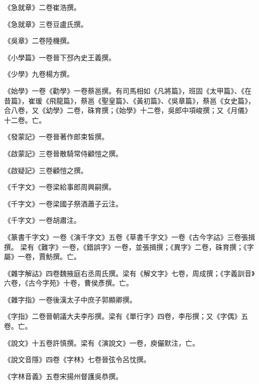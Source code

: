 \begin{pinyinscope}
 《急就章》二卷崔浩撰。



 《急就章》三卷豆盧氏撰。



 《吳章》二卷陸機撰。



 《小學篇》一卷晉下邳內史王義撰。



 《少學》九卷楊方撰。



 《始學》一卷《勸學》一卷蔡邕撰。有司馬相如《凡將篇》，班固《太甲篇》、《在昔篇》，崔瑗《飛龍篇》，蔡邕《聖皇篇》、《黃初篇》、《吳章篇》，蔡邕《女史篇》，合八卷，又《幼學》二卷，硃育撰；《始學》十二卷，吳郎中項峻撰；又《月儀》十二卷。亡。



 《發蒙記》一卷晉著作郎束皙撰。



 《啟蒙記》三卷晉散騎常侍顧愷之撰。



 《啟疑記》三卷顧愷之撰。



 《千字文》一卷梁給事郎周興嗣撰。



 《千字文》一卷梁國子祭酒蕭子云注。



 《千字文》一卷胡肅注。



 《篆書千字文》一卷《演千字文》五卷《草書千字文》一卷《古今字詁》三卷張揖撰。
 梁有《難字》一卷，《錯誤字》一卷，並張揖撰；《異字》二卷，硃育撰；《字屬》一卷，賈魴撰。亡。



 《雜字解詁》四卷魏掖庭右丞周氏撰。梁有《解文字》七卷，周成撰；《字義訓音》六卷，《古今字苑》十卷，曹侯彥撰。亡。



 《雜字指》一卷後漢太子中庶子郭顯卿撰。



 《字指》二卷晉朝議大夫李彤撰。梁有《單行字》四卷，李彤撰；又《字偶》五卷。亡。



 《說文》十五卷許慎撰。梁有《演說文》一卷，庾儼默注，亡。



 《說文音隱》四卷《字林》七卷晉弦令呂忱撰。



 《字林音義》五卷宋揚州督護吳恭撰。




\end{pinyinscope}
